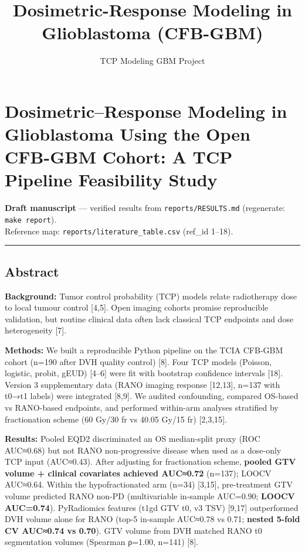 \documentclass[
  11pt,
]{article}
\title{Dosimetric-Response Modeling in Glioblastoma (CFB-GBM)}
\author{TCP Modeling GBM Project}
\date{}
\begin{document}
\maketitle

\section{Dosimetric--Response Modeling in Glioblastoma Using the Open
CFB-GBM Cohort: A TCP Pipeline Feasibility
Study}\label{dosimetricresponse-modeling-in-glioblastoma-using-the-open-cfb-gbm-cohort-a-tcp-pipeline-feasibility-study}

\textbf{Draft manuscript} --- verified results from
\texttt{reports/RESULTS.md} (regenerate: \texttt{make\ report}).\\
Reference map: \texttt{reports/literature\_table.csv} (ref\_id 1--18).

\begin{center}\rule{0.5\linewidth}{0.5pt}\end{center}

\subsection{Abstract}\label{abstract}

\textbf{Background:} Tumor control probability (TCP) models relate
radiotherapy dose to local tumour control {[}4,5{]}. Open imaging
cohorts promise reproducible validation, but routine clinical data often
lack classical TCP endpoints and dose heterogeneity {[}7{]}.

\textbf{Methods:} We built a reproducible Python pipeline on the TCIA
CFB-GBM cohort (n=190 after DVH quality control) {[}8{]}. Four TCP
models (Poisson, logistic, probit, gEUD) {[}4--6{]} were fit with
bootstrap confidence intervals {[}18{]}. Version 3 supplementary data
(RANO imaging response {[}12,13{]}, n=137 with t0→t1 labels) were
integrated {[}8,9{]}. We audited confounding, compared OS-based vs
RANO-based endpoints, and performed within-arm analyses stratified by
fractionation scheme (60 Gy/30 fr vs 40.05 Gy/15 fr) {[}2,3,15{]}.

\textbf{Results:} Pooled EQD2 discriminated an OS median-split proxy
(ROC AUC≈0.68) but not RANO non-progressive disease when used as a
dose-only TCP input (AUC≈0.43). After adjusting for fractionation
scheme, \textbf{pooled GTV volume + clinical covariates achieved
AUC≈0.72} (n=137); LOOCV AUC≈0.64. Within the hypofractionated arm
(n=34) {[}3,15{]}, pre-treatment GTV volume predicted RANO non-PD
(multivariable in-sample AUC=0.90; \textbf{LOOCV AUC=0.74}). PyRadiomics
features (t1gd GTV t0, v3 TSV) {[}9,17{]} outperformed DVH volume alone
for RANO (top-5 in-sample AUC≈0.78 vs 0.71; \textbf{nested 5-fold CV
AUC≈0.74 vs 0.70}). GTV volume from DVH matched RANO t0 segmentation
volumes (Spearman ρ=1.00, n=141) {[}8{]}.
\end{document}
